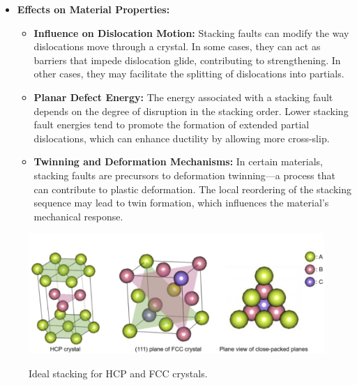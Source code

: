 \begin{itemize}
\begin{itemize}
    \end{itemize}
  \item \textbf{Effects on Material Properties:}
    \begin{itemize}
      \item \textbf{Influence on Dislocation Motion:} Stacking faults can modify the way dislocations move through a crystal. In some cases, they can act as barriers that impede dislocation glide, contributing to strengthening. In other cases, they may facilitate the splitting of dislocations into partials.
      \item \textbf{Planar Defect Energy:} The energy associated with a stacking fault depends on the degree of disruption in the stacking order. Lower stacking fault energies tend to promote the formation of extended partial dislocations, which can enhance ductility by allowing more cross-slip.
      \item \textbf{Twinning and Deformation Mechanisms:} In certain materials, stacking faults are precursors to deformation twinning—a process that can contribute to plastic deformation. The local reordering of the stacking sequence may lead to twin formation, which influences the material's mechanical response.
    \end{itemize}
\end{itemize}

\begin{figure}[ht]
  \centering
  \caption{Ideal stacking for HCP and FCC crystals.}
  \includegraphics[width=0.65\linewidth]{./figures/f4_12.png}
  \label{fig:f4_12}
\end{figure}

